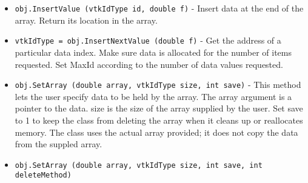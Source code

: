 \begin{itemize}
\item  \verb|obj.InsertValue (vtkIdType id, double f)| -  Insert data at the end of the array. Return its location in the array.

\item  \verb|vtkIdType = obj.InsertNextValue (double f)| -  Get the address of a particular data index. Make sure data is allocated
 for the number of items requested. Set MaxId according to the number of
 data values requested.

\item  \verb|obj.SetArray (double array, vtkIdType size, int save)| -  This method lets the user specify data to be held by the array.  The
 array argument is a pointer to the data.  size is the size of
 the array supplied by the user.  Set save to 1 to keep the class
 from deleting the array when it cleans up or reallocates memory.
 The class uses the actual array provided; it does not copy the data
 from the suppled array. 

\item  \verb|obj.SetArray (double array, vtkIdType size, int save, int deleteMethod)|

\end{itemize}
